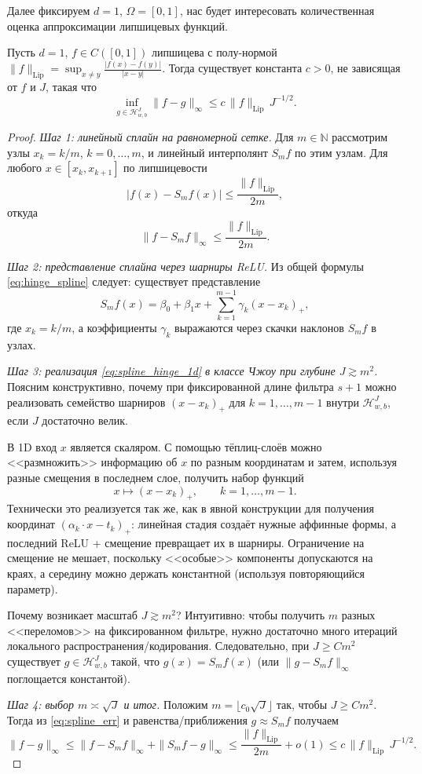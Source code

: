 \documentclass[../NDCNNAI_main.tex]{subfiles}
\begin{document}
Далее фиксируем $d=1$, $\Omega=[0,1]$, нас будет интересовать количественная оценка аппроксимации липшицевых функций.
\begin{theorem}
Пусть $d=1$, $f\in C([0,1])$ липшицева с полу-нормой
\(
\|f\|_{\mathrm{Lip}}=\sup_{x\ne y}\frac{|f(x)-f(y)|}{|x-y|}.
\)
Тогда существует константа $c>0$, не зависящая от $f$ и $J$, такая что
\[
\inf_{g\in \mathcal H^{J}_{w,b}}\|f-g\|_{\infty}\le c\,\|f\|_{\mathrm{Lip}}\,J^{-1/2}.
\]  
\end{theorem}
\begin{proof}
\emph{Шаг 1: линейный сплайн на равномерной сетке.}
Для $m\in\mathbb N$ рассмотрим узлы $x_k=k/m$, $k=0,\dots,m$, и линейный интерполянт $S_m f$ по этим узлам.
Для любого $x\in[x_k,x_{k+1}]$ по липшицевости
\[
|f(x)-S_m f(x)|\le \frac{\|f\|_{\mathrm{Lip}}}{2m},
\]
откуда
\begin{equation}
\|f-S_m f\|_\infty\le \frac{\|f\|_{\mathrm{Lip}}}{2m}.
\label{eq:spline_err}  
\end{equation}

\emph{Шаг 2: представление сплайна через шарниры ReLU.}
Из общей формулы \eqref{eq:hinge_spline} следует: существует представление
\begin{equation}
S_m f(x)=\beta_0+\beta_1 x+\sum_{k=1}^{m-1}\gamma_k (x-x_k)_+,
\label{eq:spline_hinge_1d}  
\end{equation}
где $x_k=k/m$, а коэффициенты $\gamma_k$ выражаются через скачки наклонов $S_m f$ в узлах.

\emph{Шаг 3: реализация \eqref{eq:spline_hinge_1d} в классе Чжоу при глубине $J\gtrsim m^2$.}
Поясним конструктивно, почему при фиксированной длине фильтра $s+1$ можно реализовать
семейство шарниров $(x-x_k)_+$ для $k=1,\dots,m-1$ внутри $\mathcal H^J_{w,b}$, если $J$ достаточно велик.

В 1D вход $x$ является скаляром. С помощью тёплиц-слоёв можно <<размножить>> информацию об $x$ по разным координатам
и затем, используя разные смещения в последнем слое, получить набор функций
\[
x\longmapsto (x-x_k)_+,\qquad k=1,\dots,m-1.
\]
Технически это реализуется так же, как в явной конструкции для получения координат
$(\alpha_k\cdot x-t_k)_+$: линейная стадия создаёт нужные аффинные формы, а последний ReLU + смещение превращает их в шарниры.
Ограничение на смещение не мешает, поскольку <<особые>> компоненты допускаются на краях,
а середину можно держать константной (используя повторяющийся параметр).

Почему возникает масштаб $J\gtrsim m^2$?
Интуитивно: чтобы получить $m$ разных <<переломов>> на фиксированном фильтре, нужно достаточно много итераций локального
распространения/кодирования.
Следовательно, при $J\ge C m^2$ существует $g\in\mathcal H^J_{w,b}$ такой, что $g(x)=S_m f(x)$ (или
$\|g-S_m f\|_\infty$ поглощается константой).

\emph{Шаг 4: выбор $m\asymp \sqrt{J}$ и итог.}
Положим $m=\lfloor c_0\sqrt{J}\rfloor$ так, чтобы $J\ge C m^2$.
Тогда из \eqref{eq:spline_err} и равенства/приближения $g\approx S_m f$ получаем
\[
\|f-g\|_\infty
\le \|f-S_m f\|_\infty + \|S_m f-g\|_\infty
\le \frac{\|f\|_{\mathrm{Lip}}}{2m}+o(1)
\le c\,\|f\|_{\mathrm{Lip}}\,J^{-1/2}.
\]  
\end{proof}
\end{document}
